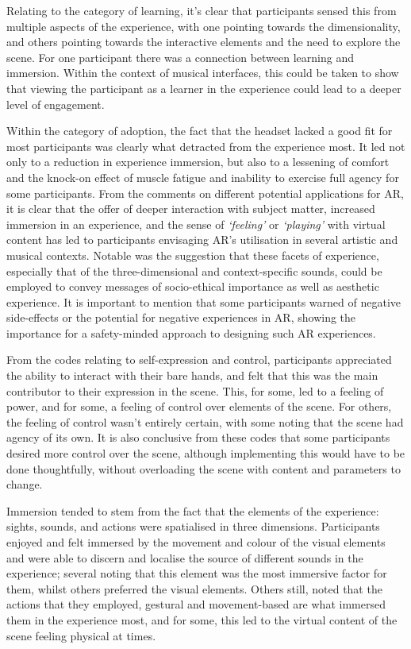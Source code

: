 Relating to the category of learning, it's clear that participants sensed this from multiple aspects of the experience, with one pointing towards the dimensionality, and others pointing towards the interactive elements and the need to explore the scene. For one participant there was a connection between learning and immersion. Within the context of musical interfaces, this could be taken to show that viewing the participant as a learner in the experience could lead to a deeper level of engagement.

Within the category of adoption, the fact that the headset lacked a good fit for most participants was clearly what detracted from the experience most. It led not only to a reduction in experience immersion, but also to a lessening of comfort and the knock-on effect of muscle fatigue and inability to exercise full agency for some participants. From the comments on different potential applications for AR, it is clear that the offer of deeper interaction with subject matter, increased immersion in an experience, and the sense of \textit{`feeling'} or \textit{`playing'} with virtual content has led to participants envisaging AR's utilisation in several artistic and musical contexts. Notable was the suggestion that these facets of experience, especially that of the three-dimensional and context-specific sounds, could be employed to convey messages of socio-ethical importance as well as aesthetic experience. It is important to mention that some participants warned of negative side-effects or the potential for negative experiences in AR, showing the importance for a safety-minded approach to designing such AR experiences.

From the codes relating to self-expression and control, participants appreciated the ability to interact with their bare hands, and felt that this was the main contributor to their expression in the scene. This, for some, led to a feeling of power, and for some, a feeling of control over elements of the scene. For others, the feeling of control wasn't entirely certain, with some noting that the scene had agency of its own. It is also conclusive from these codes that some participants desired more control over the scene, although implementing this would have to be done thoughtfully, without overloading the scene with content and parameters to change.

Immersion tended to stem from the fact that the elements of the experience: sights, sounds, and actions were spatialised in three dimensions. Participants enjoyed and felt immersed by the movement and colour of the visual elements and were able to discern and localise the source of different sounds in the experience; several noting that this element was the most immersive factor for them, whilst others preferred the visual elements. Others still, noted that the actions that they employed, gestural and movement-based are what immersed them in the experience most, and for some, this led to the virtual content of the scene feeling physical at times.


